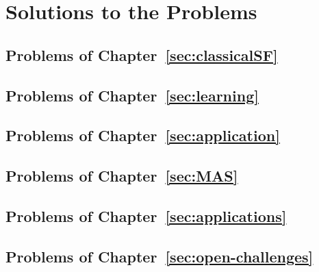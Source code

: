\chapter*{Solutions to the Problems}

\section*{Problems of Chapter~\ref{sec:classicalSF}}
\section*{Problems of Chapter~\ref{sec:learning}}
\section*{Problems of Chapter~\ref{sec:application}}
\section*{Problems of Chapter~\ref{sec:MAS}}
\section*{Problems of Chapter~\ref{sec:applications}}
\section*{Problems of Chapter~\ref{sec:open-challenges}}
